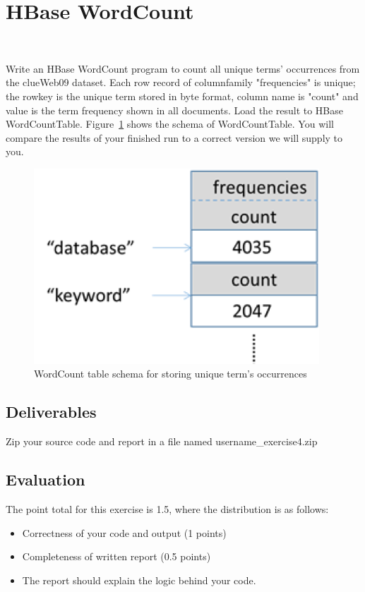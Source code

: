 \section{HBase WordCount}
\FILENAME\


 
Write an HBase WordCount program to count all unique terms' occurrences from
the clueWeb09 dataset. Each row record of columnfamily "frequencies" is unique;
the rowkey is the unique term stored in byte format, column name is "count" and
value is the term frequency shown in all documents. Load the result to HBase
WordCountTable. Figure~\ref{fig:wordcounttablescheme} shows the schema of
WordCountTable. You will compare the results of your finished run to a correct
version we will supply to you.

\begin{figure}[!htbp]
\centering
\includegraphics {section/icloud/assignment/exercise4/wordcounttablescheme}
\caption{WordCount table schema for storing unique term's occurrences}
\label{fig:wordcounttablescheme}
\end{figure}


\subsection{Deliverables}  
Zip your source code and report in a file named username\_exercise4.zip

\subsection{Evaluation} 

The point total for this exercise is 1.5, where the distribution is as follows:
\begin{itemize} 
\item Correctness of your code and output (1 points)
\item	Completeness of written report (0.5 points)
\item	The report should explain the logic behind your code.
\end{itemize}
 

